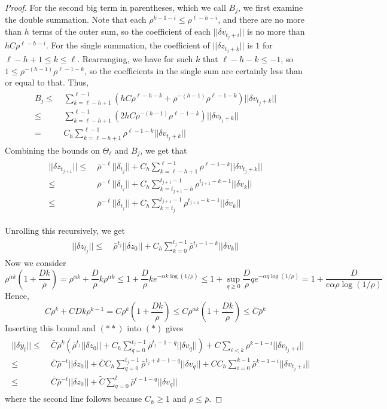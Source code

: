 \documentclass[final]{l4dc2026}
\newcommand{\lp}{\left(}
\newcommand{\rp}{\right)}
\newcommand{\f}[2]{\frac{#1}{#2}}
\newcommand{\lm}{\limits}
\newcommand{\eqspnoa}[1]{\[\begin{aligned}\begin{split} #1 \end{split}\end{aligned}\]}
\newcommand{\eqspnoan}[2]{\begin{align}\tag{#1}\begin{split} #2 \end{split}\end{align}}
\newcommand{\qq}{\\ =\  &}
\newcommand{\qqle}{\\ \le\  &}
\newcommand{\qqsle}{\le\ &}
\begin{document}
\begin{proof}
    For the second big term in parentheses, which we call $B_j$, we first examine the double summation. Note that each $\rho^{k - 1 - i} \le \rho^{\ell - h - i}$, and there are no more than $h$ terms of the outer sum, so the coefficient of each $||\delta v_{t_j + i}||$ is no more than $hC\rho^{\ell - h - i}$. For the single summation, the coefficient of $||\delta z_{t_j + k}||$ is $1$ for $\ell - h + 1 \le k \le \ell$. Rearranging, we have for such $k$ that $\ell - h - k \le -1$, so $1 \le \rho^{-(h-1)}\rho^{\ell - 1 - k}$, so the coefficients in the single sum are certainly less than or equal to that. Thus, \eqspnoa{B_j \qqsle \sum\lm_{k = \ell - h + 1}^{\ell-1}\lp hC\rho^{\ell - h - k} +  \rho^{-(h-1)}\rho^{\ell - 1 - k}\rp||\delta v_{t_j + k}|| \qqle \sum\lm_{k = \ell - h + 1}^{\ell-1}\lp 2hC\rho^{-(h-1)}\rho^{\ell - 1 - k}\rp||\delta v_{t_j + k}|| \qq C_h \sum\lm_{k = \ell - h + 1}^{\ell - 1}\rho^{\ell - 1 - k}||\delta v_{t_j + k}||}
    Combining the bounds on $\Theta_\ell$ and $B_j$, we get that \eqspnoa{||\delta z_{t_{j+1}}|| \qqsle \bar\rho^{-\ell}||\delta_{t_j}|| + C_h\sum\lm_{k = \ell - h + 1}^{\ell - 1}\rho^{\ell - 1 - k}||\delta v_{t_j + k}|| \qqle \bar\rho^{-\ell}||\delta_{t_j}|| + C_h\sum\lm_{k = t_{j+1} - h }^{t_{j+1} - 1}\rho^{t_{j+1} - k - 1}||\delta v_{k}|| \qqle \bar\rho^{-\ell}||\delta_{t_j}|| + C_h\sum\lm_{k = t_{j}}^{t_{j+1} - 1}\rho^{t_{j+1} - k - 1}||\delta v_{k}||}

    Unrolling this recursively, we get \eqspnoan{$**$}{||\delta z_{t_j}|| \qqsle \bar\rho^{t_j}||\delta z_0|| + C_h \sum\lm_{k = 0}^{t_j - 1} \bar\rho^{t_j - 1 - k}||\delta v_{k}||}
    Now we consider \[\rho^{\alpha k}\lp 1 + \f{Dk}{\rho}\rp = \rho^{\alpha k} + \f{D}{\rho} k\rho^{\alpha k} \le 1 + \f{D}{\rho}ke^{-\alpha k\log({1/\rho})} \le 1 + \sup\lm_{q \ge 0}\f{D}{\rho}qe^{-\alpha q\log(1/\rho)} = 1 + \f{D}{e\alpha \rho\log(1/\rho)}\]
    Hence, \[C\rho^k + CDk\rho^{k - 1} = C\rho^k\lp 1 + \f{Dk}{\rho} \rp \le C\rho^{\alpha k} \lp 1 + \f{Dk}{\rho} \rp\le \bar C\bar\rho^k\]
    Inserting this bound and $(**)$ into $(*)$ gives \eqspnoa{||\delta y_t|| \qqsle \bar C\bar\rho^k\lp \bar\rho^{t_j}||\delta z_0|| + C_h \sum\lm_{q = 0}^{t_j - 1} \bar\rho^{t_j - 1 - q}||\delta v_{q}|| \rp + C\sum\lm_{i < k}\rho^{k - 1 - i}||\delta v_{t_j + i}|| \qqle \bar C\bar\rho^{-t}||\delta z_0|| + \bar CC_h\sum\lm_{q = 0}^{t_j - 1}\bar\rho^{t_j + k - 1 - q}||\delta v_q|| + CC_h\sum\lm_{i = 0}^{k - 1}\bar\rho^{k - 1 - i}|| \delta v_{t_j + i}|| \qqle \bar C\bar\rho^{-t}||\delta z_0|| + \tilde{C}\sum\lm_{q = 0}^t\bar\rho^{t - 1 - q}||\delta v_{q}||}
    where the second line follows because $C_h \ge 1$ and $\rho \le \bar\rho$. 

\end{proof}
\end{document}
